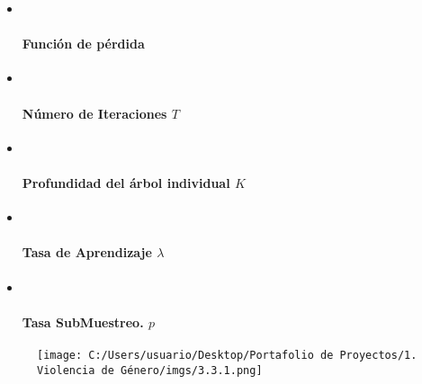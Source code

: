 \documentclass[]{article}
\let\oldparagraph\paragraph
\renewcommand{\paragraph}[1]{\oldparagraph{#1}\mbox{}}
\begin{document}
\begin{itemize}
\item ~
  \paragraph{Función de pérdida}\label{funcion-de-perdida}
\item ~
  \paragraph{\texorpdfstring{Número de Iteraciones
  \(T\)}{Número de Iteraciones T}}\label{numero-de-iteraciones-t}
\item ~
  \paragraph{\texorpdfstring{Profundidad del árbol individual
  \(K\)}{Profundidad del árbol individual K}}\label{profundidad-del-arbol-individual-k}
\item ~
  \paragraph{\texorpdfstring{Tasa de Aprendizaje
  \(\lambda\)}{Tasa de Aprendizaje \textbackslash{}lambda}}\label{tasa-de-aprendizaje-lambda}
\item ~
  \paragraph{\texorpdfstring{Tasa SubMuestreo.
  \(p\)}{Tasa SubMuestreo. p}}\label{tasa-submuestreo.-p}
\end{itemize}

\begin{figure}
\centering
\texttt{[image: C:/Users/usuario/Desktop/Portafolio de Proyectos/1. Violencia de Género/imgs/3.3.1.png]}
\caption{}
\end{figure}
\end{document}
